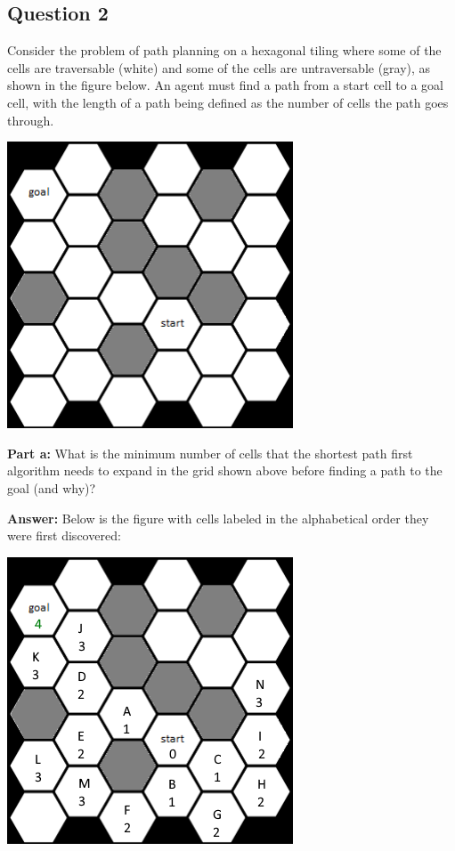 \documentclass{article}
\begin{document}
\subsection*{Question 2}
Consider the problem of path planning on a hexagonal tiling where some of the cells are traversable (white) and some of the cells are untraversable (gray), as shown in the figure below. An agent must find a path from a start cell to a goal cell, with the length of a path being defined as the number of cells the path goes through.
\begin{center}
  \includegraphics[scale=.75]{hextiles.png}  
\end{center}
\bigskip

\noindent\textbf{Part a:} What is the minimum number of cells that the shortest path first algorithm needs to expand in the grid shown above before finding a path to the goal (and why)?
\bigskip

\noindent\textbf{Answer:} Below is the figure with cells labeled in the alphabetical order they were first discovered:
\begin{center}
  \includegraphics[scale=.75]{hextiles2a.png}  
\end{center}
\end{document}
